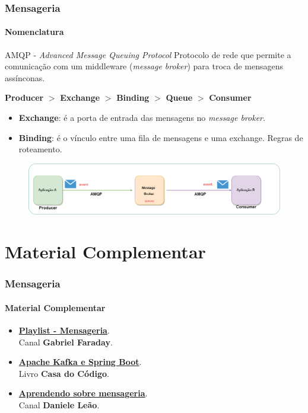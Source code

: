 \documentclass[
	9pt, %
	t, %
]{beamer}
\newcommand{\iconLink}[2]{\href{#1}{\faLink \hspace{0.2em} {#2}}}
\newcommand{\yellowbox}[1]{\colorbox{yellow!75}{#1}}
\begin{document}
\begin{frame}
	\frametitle{Mensageria}
	\framesubtitle{Nomenclatura}
	
	\begin{block}{AMQP - \textit{Advanced Message Queuing Protocol}}
		Protocolo de rede que permite a comunicação com um middleware (\textit{message broker}) para troca de mensagens assínconas. \\ \smallskip
		
		\begin{center}
			\textbf{Producer} $>$ \yellowbox{\textbf{Exchange} $>$ \textbf{Binding} $>$ \textbf{Queue}} $>$ \textbf{Consumer}
		\end{center}

		\begin{itemize}
			\item \textbf{Exchange}: é a porta de entrada das mensagens no \textit{message broker}.
			\item \textbf{Binding}: é o vínculo entre uma fila de mensagens e uma exchange. Regras de roteamento.
		\end{itemize}
	\end{block}

	\begin{figure}
		\centering
		\includegraphics[width=0.9\linewidth]{Images/message_broker.png}
	\end{figure}


\end{frame}

\section{Material Complementar}

\begin{frame}
	\frametitle{Mensageria}
	\framesubtitle{Material Complementar}
	
	\begin{itemize}
		\item \iconLink{https://www.youtube.com/playlist?list=PLqONbZa3fPe4Z6sg7RQGaHlYqUjsliKAH}{\textbf{Playlist - Mensageria}}.\\Canal \textbf{Gabriel Faraday}.
		\item \iconLink{https://www.youtube.com/watch?v=A3gmE5yC97g}{\textbf{Apache Kafka e Spring Boot}}.\\Livro \textbf{Casa do Código}.
		\item \iconLink{https://www.casadocodigo.com.br/products/livro-apache-kafka}{\textbf{Aprendendo sobre mensageria}}.\\Canal \textbf{Daniele Leão}.
	\end{itemize}

\end{frame}
\end{document}
